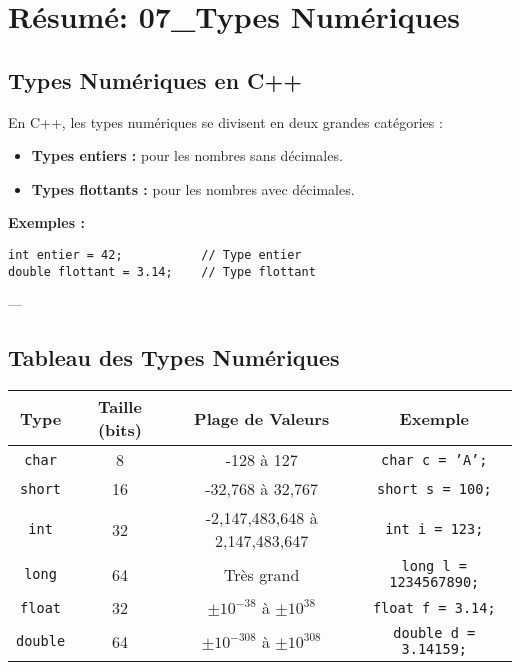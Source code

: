 \section{ Résumé: 07\_Types Numériques}

\subsection{ Types Numériques en C++}
En C++, les types numériques se divisent en deux grandes catégories :
\begin{itemize}
    \item \textbf{Types entiers :} pour les nombres sans décimales.
    \item \textbf{Types flottants :} pour les nombres avec décimales.
\end{itemize}

\textbf{Exemples :}
\begin{tcolorbox}[colframe=blue!50!black, colback=blue!5!white, title=Exemples de Types Numériques]
\begin{verbatim}
int entier = 42;           // Type entier
double flottant = 3.14;    // Type flottant
\end{verbatim}
\end{tcolorbox}

---

\subsection{ Tableau des Types Numériques}
\begin{center}
    \begin{tabular}{|c|c|c|c|}
        \hline
        \textbf{Type} & \textbf{Taille (bits)} & \textbf{Plage de Valeurs} & \textbf{Exemple} \\
        \hline
        \texttt{char} & 8 & -128 à 127 & \texttt{char c = 'A';} \\
        \hline
        \texttt{short} & 16 & -32,768 à 32,767 & \texttt{short s = 100;} \\
        \hline
        \texttt{int} & 32 & -2,147,483,648 à 2,147,483,647 & \texttt{int i = 123;} \\
        \hline
        \texttt{long} & 64 & Très grand & \texttt{long l = 1234567890;} \\
        \hline
        \texttt{float} & 32 & $\pm 10^{-38}$ à $\pm 10^{38}$ & \texttt{float f = 3.14;} \\
        \hline
        \texttt{double} & 64 & $\pm 10^{-308}$ à $\pm 10^{308}$ & \texttt{double d = 3.14159;} \\
        \hline
    \end{tabular}
\end{center}

